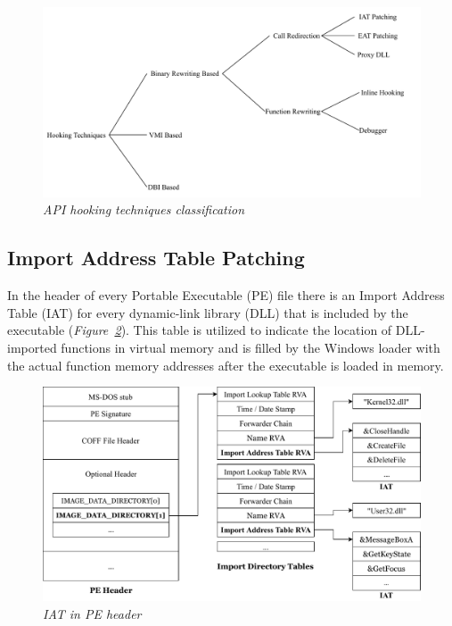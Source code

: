 \begin{figure}[h]
\centering
\hspace*{-3em}
\includegraphics[scale=0.8]{Figures/API-hooking-3.pdf}
\caption{\textit{API hooking techniques classification}}
\label{HookTech}
\end{figure}

\subsection{Import Address Table Patching}

In the header of every Portable Executable (PE) file there is an Import Address Table (IAT) for every dynamic-link library (DLL) that is included by the executable \cite{Berdajs:2010:EAU:1815744.1815746} (\textit{Figure~\ref{IAT}}). This table is utilized to indicate the location of DLL-imported functions in virtual memory and is filled by the Windows loader with the actual function memory addresses after the executable is loaded in memory.

\begin{figure}[h]
\centering
\hspace*{-3em}
\includegraphics[scale=0.8]{Figures/IAT-3.pdf}
\caption{\textit{IAT in PE header}}
\label{IAT}
\end{figure}

